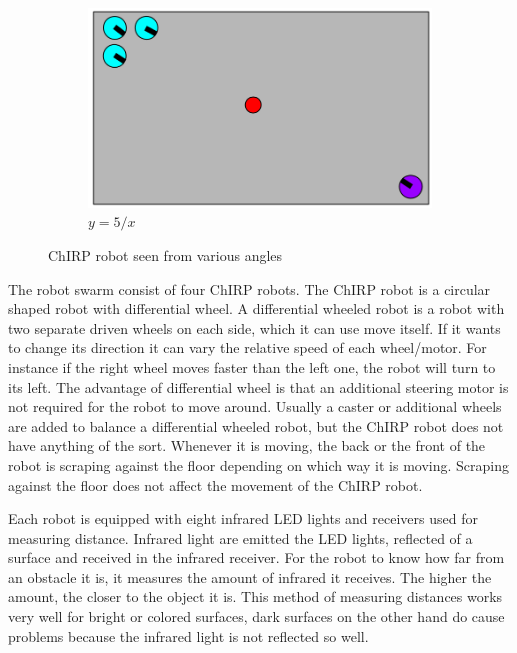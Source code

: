 \begin{figure}[H]
    \hfill
    \begin{subfigure}[b]{0.3\textwidth}
        \centering
        \includegraphics[width=\textwidth]{figs/scenario1.png}
        \caption{$y=5/x$}
        \label{fig:robot2}
    \end{subfigure}
    \caption[ChIRP robot]{ChIRP robot seen from various angles}
    \label{fig:robot}
\end{figure}


The robot swarm consist of four ChIRP robots. The ChIRP robot is a circular shaped robot with differential wheel. A differential wheeled robot is a robot with two separate driven wheels on each side, which it can use move itself. If it wants to change its direction it can vary the relative speed of each wheel/motor. For instance if the right wheel moves faster than the left one, the robot will turn to its left.
The advantage of differential wheel is that an additional steering motor is not required for the robot to move around. Usually a caster or additional wheels are added to balance a differential wheeled robot, but the ChIRP robot does not have anything of the sort. Whenever it is moving, the back or the front of the robot is scraping against the floor depending on which way it is moving. Scraping against the floor does not affect the movement of the ChIRP robot.

Each robot is equipped with eight infrared LED lights and receivers used for measuring distance. Infrared light are emitted the LED lights, reflected of a surface and received in the infrared receiver. For the robot to know how far from an obstacle it is, it measures the amount of infrared it receives. The higher the amount, the closer to the object it is. This method of measuring distances works very well for bright or colored surfaces, dark surfaces on the other hand do cause problems because the infrared light is not reflected so well.

